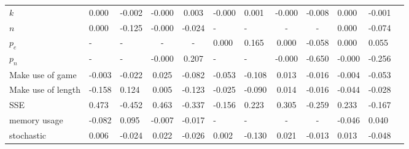 \begin{tabular}{lggccggccggg}
$k$                  &  0.000 & -0.002 &  -0.000 &   0.003 &  -0.000 &   0.001 &  -0.000 &  -0.008 &   0.000 &  -0.001 \\
$n$                  &  0.000 & -0.125 &  -0.000 &  -0.024 &       - &       - &       - &       - &   0.000 &  -0.074 \\
$p_e$                &      - &      - &        - &     - &    0.000 &   0.165 &   0.000 &  -0.058 &   0.000 &   0.055 \\
$p_n$                &      - &      - &  -0.000 &   0.207 &       - &       - &  -0.000 &  -0.650 &  -0.000 &  -0.256 \\
Make use of game     & -0.003 & -0.022 &   0.025 &  -0.082 &  -0.053 &  -0.108 &   0.013 &  -0.016 &  -0.004 &  -0.053 \\
Make use of length   & -0.158 &  0.124 &   0.005 &  -0.123 &  -0.025 &  -0.090 &   0.014 &  -0.016 &  -0.044 &  -0.028 \\
SSE                  &  0.473 & -0.452 &   0.463 &  -0.337 &  -0.156 &   0.223 &   0.305 &  -0.259 &   0.233 &  -0.167 \\
memory usage         & -0.082 &  0.095 &  -0.007 &  -0.017 &       - &     - &     - &           - &  -0.046 &   0.040 \\
stochastic           &  0.006 & -0.024 &   0.022 &  -0.026 &   0.002 &  -0.130 &   0.021 &  -0.013 &   0.013 &  -0.048 \\
\bottomrule
\end{tabular}
